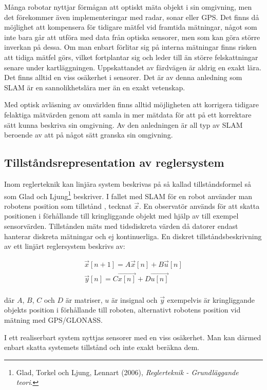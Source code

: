 \documentclass[a4paper,12pt,fleqn]{article}
\begin{document}
Många robotar nyttjar förmågan att optiskt mäta objekt i sin omgivning, men det förekommer även implementeringar med radar, sonar eller GPS. Det finns då möjlighet att kompensera för tidigare mätfel vid framtida mätningar, något som inte bara går att utföra med data från optiska sensorer, men som kan göra större inverkan på dessa. Om man enbart förlitar sig på interna mätningar finns risken att tidiga mätfel görs, vilket fortplantar sig och leder till än större felskattningar senare under kartläggningen. 
Uppskattandet av färdvägen är aldrig en exakt lära. Det finns alltid en viss osäkerhet i sensorer. Det är av denna anledning som SLAM är en sannolikhetslära mer än en exakt vetenskap. 

Med optisk avläsning av omvärlden finns alltid möjligheten att korrigera tidigare felaktiga mätvärden genom att samla in mer mätdata för att på ett korrektare sätt kunna beskriva sin omgivning. Av den anledningen är all typ av SLAM beroende av att på något sätt granska sin omgivning. 

\newpage

\subsection{Tillståndsrepresentation av reglersystem}

Inom reglerteknik kan linjära system beskrivas på så kallad tillståndsformel så som Glad och Ljung\footnote{Glad, Torkel och Ljung, Lennart (2006), \textit{Reglerteknik - Grundläggande teori}.} beskriver. I fallet med SLAM för en robot använder man robotens position som tillstånd , tecknat $\vec{x}$. En observatör används för att skatta positionen i förhållande till kringliggande objekt med hjälp av till exempel sensorvärden. Tillstånden mäts med tidsdiskreta värden då datorer endast hanterar diskreta mätningar och ej kontinuerliga. En diskret tillståndsbeskrivning av ett linjärt reglersystem beskrivs av: 

\begin{gather}
\vec{x}[n+1] = A\vec{x}[n] + B\vec{u}[n] \\
\vec{y}[n] = C\vec{x[n]} + D\vec{u[n]}
\end{gather}
\\
där $A$, $B$, $C$ och $D$ är matriser, $u$ är insignal och $\vec{y}$ exempelvis är kringliggande objekts position i förhållande till roboten, alternativt robotens position vid mätning med GPS/GLONASS. 

I ett realiserbart system nyttjas sensorer med en viss osäkerhet. Man kan därmed enbart skatta systemets tillstånd och inte exakt beräkna dem. 
\end{document}
